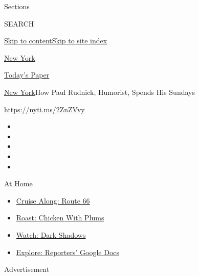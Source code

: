 Sections

SEARCH

\protect\hyperlink{site-content}{Skip to
content}\protect\hyperlink{site-index}{Skip to site index}

\href{https://www.nytimes3xbfgragh.onion/section/nyregion}{New York}

\href{https://myaccount.nytimes3xbfgragh.onion/auth/login?response_type=cookie\&client_id=vi}{}

\href{https://www.nytimes3xbfgragh.onion/section/todayspaper}{Today's
Paper}

\href{/section/nyregion}{New York}\textbar{}How Paul Rudnick, Humorist,
Spends His Sundays

\url{https://nyti.ms/2ZnZVvy}

\begin{itemize}
\item
\item
\item
\item
\item
\end{itemize}

\href{https://www.nytimes3xbfgragh.onion/spotlight/at-home?action=click\&pgtype=Article\&state=default\&region=TOP_BANNER\&context=at_home_menu}{At
Home}

\begin{itemize}
\tightlist
\item
  \href{https://www.nytimes3xbfgragh.onion/2020/09/07/travel/route-66.html?action=click\&pgtype=Article\&state=default\&region=TOP_BANNER\&context=at_home_menu}{Cruise
  Along: Route 66}
\item
  \href{https://www.nytimes3xbfgragh.onion/2020/09/04/dining/sheet-pan-chicken.html?action=click\&pgtype=Article\&state=default\&region=TOP_BANNER\&context=at_home_menu}{Roast:
  Chicken With Plums}
\item
  \href{https://www.nytimes3xbfgragh.onion/2020/09/04/arts/television/dark-shadows-stream.html?action=click\&pgtype=Article\&state=default\&region=TOP_BANNER\&context=at_home_menu}{Watch:
  Dark Shadows}
\item
  \href{https://www.nytimes3xbfgragh.onion/interactive/2020/at-home/even-more-reporters-editors-diaries-lists-recommendations.html?action=click\&pgtype=Article\&state=default\&region=TOP_BANNER\&context=at_home_menu}{Explore:
  Reporters' Google Docs}
\end{itemize}

Advertisement

